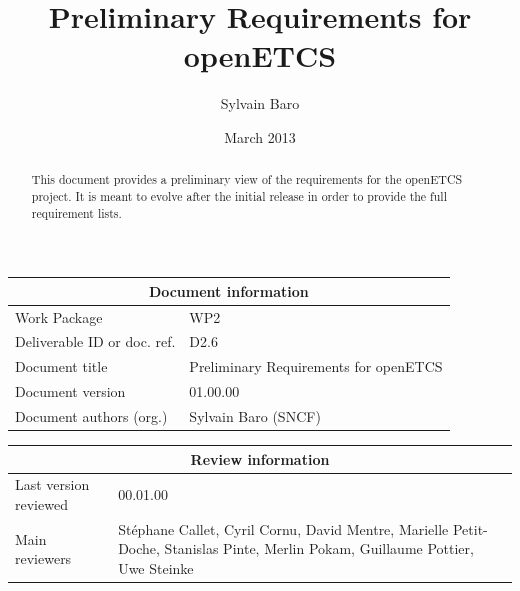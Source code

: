 \documentclass{template/openetcs_article}
\begin{document}
\frontmatter
{}




\title{Preliminary Requirements for openETCS}


\date{March 2013}


\author{Sylvain Baro}
  
  





%
\begin{abstract}
This document provides a preliminary view of the requirements for the openETCS project. 
It is meant to evolve after the initial release in order to provide the full requirement lists.
\end{abstract}

\maketitle

% 

\begin{tabular}{|p{4.4cm}|p{8.7cm}|}
\hline
\multicolumn{2}{|c|}{Document information} \\
\hline
Work Package &  WP2  \\
Deliverable ID or doc. ref. & D2.6\\
\hline
Document title & Preliminary Requirements for openETCS \\
Document version & 01.00.00 \\
Document authors (org.)  & Sylvain Baro (SNCF) \\
\hline
\end{tabular}

\begin{tabular}{|p{4.4cm}|p{8.7cm}|}
\hline
\multicolumn{2}{|c|}{Review information} \\
\hline
Last version reviewed & 00.01.00 \\
\hline
Main reviewers & St\'ephane Callet, Cyril Cornu, David Mentre, Marielle Petit-Doche, Stanislas Pinte, Merlin Pokam, Guillaume Pottier, Uwe Steinke\\
\hline
\end{tabular}
\end{document}

